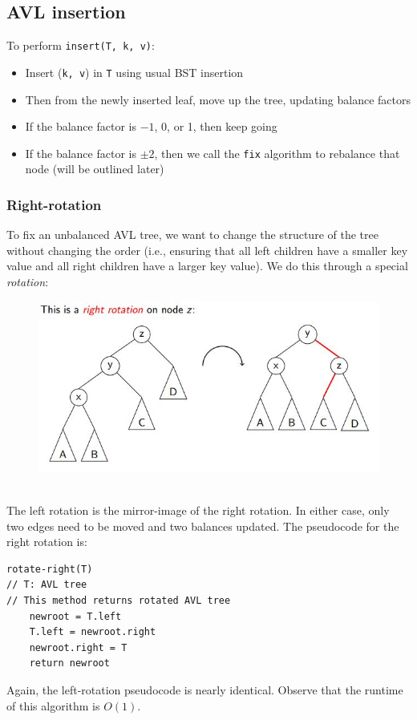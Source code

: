\documentclass{report}
\begin{document}
\subsection{AVL insertion}
To perform \texttt{insert(T, k, v)}:
\begin{itemize}
\item Insert (\texttt{k, v}) in \texttt{T} using usual BST insertion
\item Then from the newly inserted leaf, move up the tree, updating balance factors
\item If the balance factor is $-1$, 0, or 1, then keep going
\item If the balance factor is $\pm 2$, then we call the \texttt{fix} algorithm to rebalance that node (will be outlined later)
\end{itemize}
\subsubsection{Right-rotation}
To fix an unbalanced AVL tree, we want to change the structure of the tree without changing the order (i.e., ensuring that all left children have a smaller key value and all right children have a larger key value). We do this through a special \textit{rotation}:
\begin{figure}[ht]
\begin{center}
\includegraphics[scale=0.8]{right_rotation.jpg}
\end{center}
\end{figure}\\
The left rotation is the mirror-image of the right rotation. In either case, only two edges need to be moved and two balances updated. The pseudocode for the right rotation is:
\begin{lstlisting}
rotate-right(T)
// T: AVL tree
// This method returns rotated AVL tree
	newroot = T.left
	T.left = newroot.right
	newroot.right = T
	return newroot
\end{lstlisting}
Again, the left-rotation pseudocode is nearly identical. Observe that the runtime of this algorithm is $O(1)$.
\end{document}
